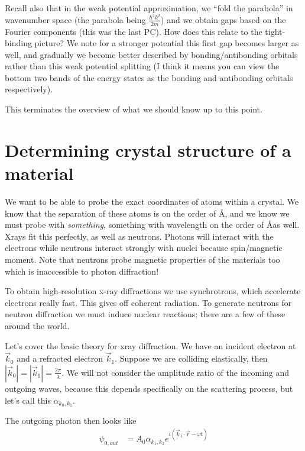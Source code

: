 \documentclass[10pt]{report}
\newcommand{\abs}[1]{\left|#1\right|}
\begin{document}
Recall also that in the weak potential approximation, we ``fold the parabola'' in wavenumber space (the parabola being $\frac{\hbar^2 k^2}{2m}$) and we obtain gaps based on the Fourier components (this was the last PC). How does this relate to the tight-binding picture? We note for a stronger potential this first gap becomes larger as well, and gradually we become better described by bonding/antibonding orbitals rather than this weak potential splitting (I think it means you can view the bottom two bands of the energy states as the bonding and antibonding orbitals respectively).

This terminates the overview of what we should know up to this point.

\section{Determining crystal structure of a material}

We want to be able to probe the exact coordinates of atoms within a crystal. We know that the separation of these atoms is on the order of \AA, and we know we must probe with \emph{something}, something with wavelength on the order of \AA\@ as well. Xrays fit this perfectly, as well as neutrons. Photons will interact with the electrons while neutrons interact strongly with nuclei because spin/magnetic moment. Note that neutrons probe magnetic properties of the materials too which is inaccessible to photon diffraction!

To obtain high-resolution x-ray diffractions we use synchrotrons, which accelerate electrons really fast. This gives off coherent radiation. To generate neutrons for neutron diffraction we must induce nuclear reactions; there are a few of these around the world.

Let's cover the basic theory for xray diffraction. We have an incident electron at $\vec{k}_0$ and a refracted electron $\vec{k}_1$. Suppose we are colliding elastically, then $\abs{\vec{k}_0} = \abs{\vec{k}_1} = \frac{2\pi}{\lambda}$. We will not consider the amplitude ratio of the incoming and outgoing waves, because this depends specifically on the scattering process, but let's call this $\alpha_{k_0, k_1}$.

The outgoing photon then looks like 
\begin{align}
    \psi_{0,out} &= A_0 \alpha_{k_1, k_2} e^{i\left( \vec{k}_1 \cdot \vec{r} - \omega t \right)}
\end{align}
\end{document}
